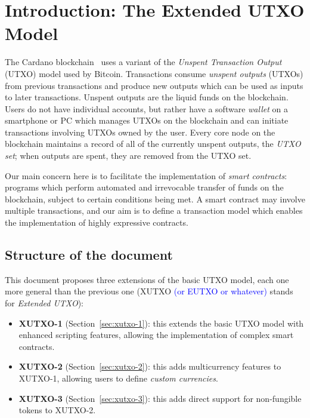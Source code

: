 \documentclass[a4paper]{article}
\newcommand{\blue}[1]{\textcolor{blue}{#1}}
\theoremstyle{definition}  %
\begin{document}
\maketitle

\section{Introduction: The Extended UTXO Model}
\label{sec:intro}
The Cardano blockchain~\cite{Cardano} uses a variant of the \textit{Unspent
  Transaction Output} (UTXO) model used by Bitcoin.  Transactions
consume \textit{unspent outputs} (UTXOs) from previous transactions
and produce new outputs which can be used as inputs to later
transactions.  Unspent outputs are the liquid funds on the
blockchain. Users do not have individual accounts, but rather have a
software \textit{wallet} on a smartphone or PC which manages UTXOs on
the blockchain and can initiate transactions involving UTXOs owned by
the user.  Every core node on the blockchain maintains a record of all
of the currently unspent outputs, the \textit{UTXO set}; when outputs
are spent, they are removed from the UTXO set.

Our main concern here is to facilitate the implementation of
\textit{smart contracts}: programs which perform automated and
irrevocable transfer of funds on the blockchain, subject to certain
conditions being met.  A smart contract may involve multiple
transactions, and our aim is to define a transaction model which
enables the implementation of highly expressive contracts.

\subsection{Structure of the document}
\label{sec:doc-structure}
This document proposes three extensions of the basic UTXO model, each
one more general than the previous one (XUTXO \blue{(or EUTXO or whatever)} stands for
\textit{Extended UTXO}):

\begin{itemize}
  \item \textbf{XUTXO-1} (Section~\ref{sec:xutxo-1}): this extends the
    basic UTXO model with enhanced scripting features, allowing the
    implementation of complex smart contracts.
  \item \textbf{XUTXO-2} (Section~\ref{sec:xutxo-2}): this adds
    multicurrency features to XUTXO-1, allowing users to define
    \textit{custom currencies}.
  \item \textbf{XUTXO-3} (Section~\ref{sec:xutxo-3}): this adds direct
    support for non-fungible tokens to XUTXO-2.
\end{itemize}
\end{document}
